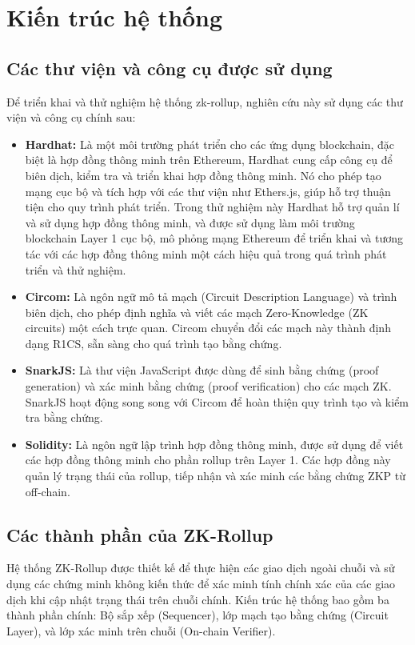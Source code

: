 \section{Kiến trúc hệ thống}
\subsection{Các thư viện và công cụ được sử dụng}
Để triển khai và thử nghiệm hệ thống zk-rollup, nghiên cứu này sử dụng các thư viện và công cụ chính sau:

\begin{itemize}
    \item \textbf{Hardhat:} Là một môi trường phát triển cho các ứng dụng blockchain, đặc biệt là hợp đồng thông minh trên Ethereum, Hardhat cung cấp công cụ để biên dịch, kiểm tra và triển khai hợp đồng thông minh. Nó cho phép tạo mạng cục bộ và tích hợp với các thư viện như Ethers.js, giúp hỗ trợ thuận tiện cho quy trình phát triển. Trong thử nghiệm này Hardhat hỗ trợ quản lí và sử dụng hợp đồng thông minh, và được sử dụng làm môi trường blockchain Layer 1 cục bộ, mô phỏng mạng Ethereum để triển khai và tương tác với các hợp đồng thông minh một cách hiệu quả trong quá trình phát triển và thử nghiệm.
    \item \textbf{Circom:}  Là ngôn ngữ mô tả mạch (Circuit Description Language) và trình biên dịch, cho phép định nghĩa và viết các mạch Zero-Knowledge (ZK circuits) một cách trực quan. Circom chuyển đổi các mạch này thành định dạng R1CS, sẵn sàng cho quá trình tạo bằng chứng.
    \item \textbf{SnarkJS:} Là thư viện JavaScript được dùng để sinh bằng chứng (proof generation) và xác minh bằng chứng (proof verification) cho các mạch ZK. SnarkJS hoạt động song song với Circom để hoàn thiện quy trình tạo và kiểm tra bằng chứng.
    
    \item \textbf{Solidity:} Là ngôn ngữ lập trình hợp đồng thông minh, được sử dụng để viết các hợp đồng thông minh cho phần rollup trên Layer 1. Các hợp đồng này quản lý trạng thái của rollup, tiếp nhận và xác minh các bằng chứng ZKP từ off-chain.
\end{itemize}

\subsection{Các thành phần của ZK-Rollup}
Hệ thống ZK-Rollup được thiết kế để thực hiện các giao dịch ngoài chuỗi và sử dụng các chứng minh không kiến thức để xác minh tính chính xác của các giao dịch khi cập nhật trạng thái trên chuỗi chính. Kiến trúc hệ thống bao gồm ba thành phần chính: Bộ sắp xếp (Sequencer), lớp mạch tạo bằng chứng (Circuit Layer), và lớp xác minh trên chuỗi (On-chain Verifier).


